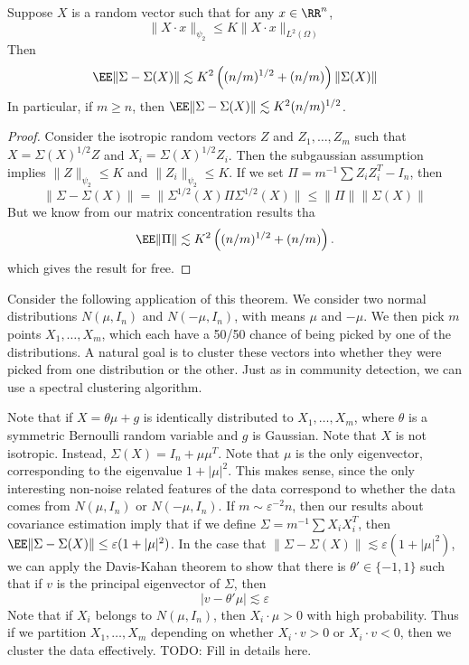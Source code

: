 \begin{theorem}
	Suppose $X$ is a random vector such that for any $x \in \RR^n$,
	\[ \| X \cdot x \|_{\psi_2} \leq K \| X \cdot x \|_{L^2(\Omega)} \]
	Then
	\[ \EE \| \Sigma - \Sigma(X) \| \lesssim K^2 \left( (n/m)^{1/2} + (n/m) \right) \| \Sigma(X) \| \]
	In particular, if $m \geq n$, then $\EE \| \Sigma - \Sigma(X) \| \lesssim K^2 (n/m)^{1/2}$.
\end{theorem}
\begin{proof}
	Consider the isotropic random vectors $Z$ and $Z_1, \dots, Z_m$ such that $X = \Sigma(X)^{1/2} Z$ and $X_i = \Sigma(X)^{1/2} Z_i$. Then the subgaussian assumption implies $\| Z \|_{\psi_2} \leq K$ and $\| Z_i \|_{\psi_2} \leq K$. If we set $\Pi = m^{-1} \sum Z_i Z_i^T - I_n$, then
	\[ \| \Sigma - \Sigma(X) \| = \| \Sigma^{1/2}(X) \Pi \Sigma^{1/2}(X) \| \leq \| \Pi \| \| \Sigma(X) \| \]
	But we know from our matrix concentration results tha
	\[ \EE \| \Pi \| \lesssim K^2 \left( (n/m)^{1/2} + (n/m) \right). \]
	which gives the result for free.
\end{proof}

Consider the following application of this theorem. We consider two normal distributions $N(\mu,I_n)$ and $N(-\mu,I_n)$, with means $\mu$ and $-\mu$. We then pick $m$ points $X_1, \dots, X_m$, which each have a 50/50 chance of being picked by one of the distributions. A natural goal is to cluster these vectors into whether they were picked from one distribution or the other. Just as in community detection, we can use a spectral clustering algorithm.

Note that if $X = \theta \mu + g$ is identically distributed to $X_1, \dots, X_m$, where $\theta$ is a symmetric Bernoulli random variable and $g$ is Gaussian. Note that $X$ is not isotropic. Instead, $\Sigma(X) = I_n + \mu \mu^T$. Note that $\mu$ is the only eigenvector, corresponding to the eigenvalue $1 + |\mu|^2$. This makes sense, since the only interesting non-noise related features of the data correspond to whether the data comes from $N(\mu,I_n)$ or $N(-\mu,I_n)$. If $m \sim \varepsilon^{-2} n$, then our results about covariance estimation imply that if we define $\Sigma = m^{-1} \sum X_i X_i^T$, then $\EE \| \Sigma - \Sigma(X) \| \leq \varepsilon (1 + |\mu|^2)$. In the case that $\| \Sigma - \Sigma(X) \| \lesssim \varepsilon (1 + |\mu|^2)$, we can apply the Davis-Kahan theorem to show that there is $\theta' \in \{ -1 , 1 \}$ such that if $v$ is the principal eigenvector of $\Sigma$, then
%
\[ |v - \theta' \mu| \lesssim \varepsilon \]
%
Note that if $X_i$ belongs to $N(\mu,I_n)$, then $X_i \cdot \mu > 0$ with high probability. Thus if we partition $X_1, \dots, X_m$ depending on whether $X_i \cdot v > 0$ or $X_i \cdot v < 0$, then we cluster the data effectively. TODO: Fill in details here.

